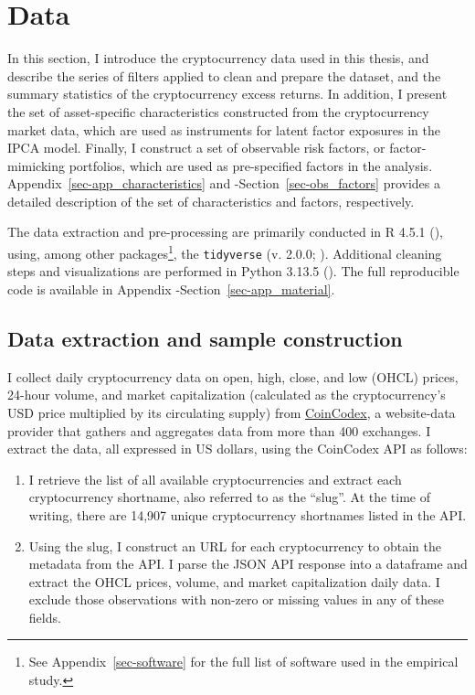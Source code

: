 \documentclass[
  12pt,
  a4paper,
  openany]{scrbook}
\begin{document}

\chapter{Data}\label{sec-data}

In this section, I introduce the cryptocurrency data used in this
thesis, and describe the series of filters applied to clean and prepare
the dataset, and the summary statistics of the cryptocurrency excess
returns. In addition, I present the set of asset-specific
characteristics constructed from the cryptocurrency market data, which
are used as instruments for latent factor exposures in the IPCA model.
Finally, I construct a set of observable risk factors, or
factor-mimicking portfolios, which are used as pre-specified factors in
the analysis. Appendix~\ref{sec-app_characteristics} and
-Section~\ref{sec-obs_factors} provides a detailed description of the
set of characteristics and factors, respectively.

The data extraction and pre-processing are primarily conducted in R
4.5.1 (), using, among other
packages\footnote{See Appendix~\ref{sec-software} for the full list of
  software used in the empirical study.}, the \texttt{tidyverse} (v.
2.0.0; ). Additional
cleaning steps and visualizations are performed in Python 3.13.5
(). The full
reproducible code is available in Appendix
-Section~\ref{sec-app_material}.

\section{Data extraction and sample
construction}\label{data-extraction-and-sample-construction}

I collect daily cryptocurrency data on open, high, close, and low (OHCL)
prices, 24-hour volume, and market capitalization (calculated as the
cryptocurrency's USD price multiplied by its circulating supply) from
\href{https://coincodex.com/}{CoinCodex}, a website-data provider that
gathers and aggregates data from more than 400 exchanges. I extract the
data, all expressed in US dollars, using the CoinCodex API as follows:

\begin{enumerate}
\def\labelenumi{\arabic{enumi}.}
\item
  I retrieve the list of all available cryptocurrencies and extract each
  cryptocurrency shortname, also referred to as the ``slug''. At the
  time of writing, there are 14,907 unique cryptocurrency shortnames
  listed in the API.
\item
  Using the slug, I construct an URL for each cryptocurrency to obtain
  the metadata from the API. I parse the JSON API response into a
  dataframe and extract the OHCL prices, volume, and market
  capitalization daily data. I exclude those observations with non-zero
  or missing values in any of these fields.
\end{enumerate}
\end{document}
